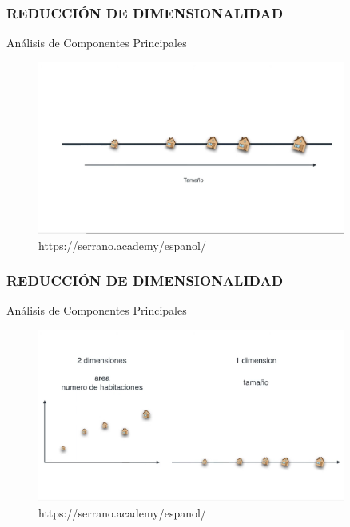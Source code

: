 \documentclass{beamer}
\begin{document}
\begin{frame}
	\frametitle{REDUCCIÓN DE DIMENSIONALIDAD}
	\begin{block}{Análisis de Componentes Principales}	
		\begin{figure}
			\includegraphics[width=0.9\textwidth]{PCA/IMG_3540.jpg}
			\caption{https://serrano.academy/espanol/}
		\end{figure}
	\end{block}
\end{frame}


\begin{frame}
	\frametitle{REDUCCIÓN DE DIMENSIONALIDAD}
	\begin{block}{Análisis de Componentes Principales}	
		\begin{figure}
			\includegraphics[width=0.9\textwidth]{PCA/IMG_3541.jpg}
			\caption{https://serrano.academy/espanol/}
		\end{figure}
	\end{block}
\end{frame}
\end{document}
